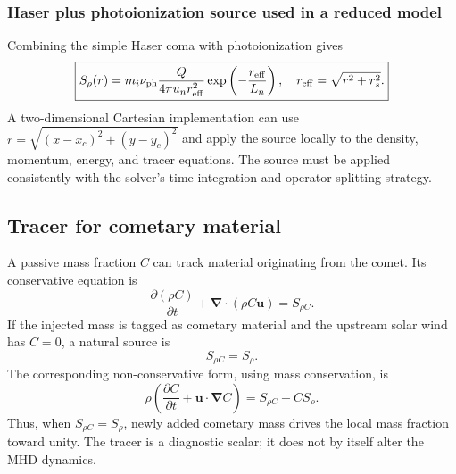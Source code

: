 \documentclass[11pt,a4paper]{article}
\newcommand{\Div}{\boldsymbol{\nabla}\!\cdot}
\newcommand{\grad}{\boldsymbol{\nabla}}
\newcommand{\uvec}{\boldsymbol{u}}
\newcommand{\rhov}{\rho}
\begin{document}
\subsubsection{Haser plus photoionization source used in a reduced model}
Combining the simple Haser coma with photoionization gives
\begin{equation}
\boxed{S_\rho(r)=m_i\nu_{\rm ph}\frac{Q}{4\pi u_n r_{\rm eff}^2}
\exp\left(-\frac{r_{\rm eff}}{L_n}\right),\quad
r_{\rm eff}=\sqrt{r^2+r_s^2}.}
\label{eq:reduced-source}
\end{equation}
A two-dimensional Cartesian implementation can use $r=\sqrt{(x-x_c)^2+(y-y_c)^2}$ and apply the source locally to the density, momentum, energy, and tracer equations. The source must be applied consistently with the solver's time integration and operator-splitting strategy.

\subsection{Tracer for cometary material}
A passive mass fraction $C$ can track material originating from the comet. Its conservative equation is
\begin{equation}
\frac{\partial(\rhov C)}{\partial t}+\Div(\rhov C\uvec)=S_{\rho C}.
\label{eq:tracer-general}
\end{equation}
If the injected mass is tagged as cometary material and the upstream solar wind has $C=0$, a natural source is
\begin{equation}
\boxed{S_{\rho C}=S_\rho.}
\label{eq:tracer-source}
\end{equation}
The corresponding non-conservative form, using mass conservation, is
\begin{equation}
\rhov\left(\frac{\partial C}{\partial t}+\uvec\cdot\grad C\right)
=S_{\rho C}-CS_\rho.
\end{equation}
Thus, when $S_{\rho C}=S_\rho$, newly added cometary mass drives the local mass fraction toward unity. The tracer is a diagnostic scalar; it does not by itself alter the MHD dynamics.
\end{document}
